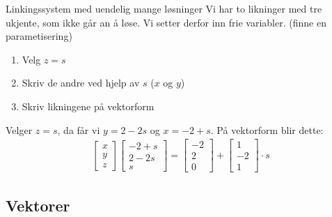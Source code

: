 \documentclass[11pt, a4paper, norsk]{article}
\begin{document}
\begin{Example}{Linkingssystem med uendelig mange løsninger}{}
           Vi har to likninger med tre ukjente, som ikke går an å løse. Vi setter derfor inn frie variabler. (finne en parametisering)
           \begin{enumerate}
               \item Velg $z = s$
               \item Skriv de andre ved hjelp av $s$ ($x$ og $y$)
               \item Skriv likningene på vektorform
           \end{enumerate}
           Velger $z=s$, da får vi $y = 2-2s$ og $x = -2+s$. På vektorform blir dette:
           \begin{align*}
               \begin{bmatrix}
                   x \\
                   y \\
                   z
                   \end{bmatrix} \begin{bmatrix}
                                    -2 + s \\
                                    2 - 2s \\
                                    s
                                    \end{bmatrix} = \begin{bmatrix}
                                                        -2 \\
                                                        2 \\
                                                        0
                                                        \end{bmatrix} + \begin{bmatrix}
                                                        1 \\
                                                        -2 \\
                                                        1
                                                    \end{bmatrix}\cdot s
           \end{align*}
        \end{Example}
        \subsection{Vektorer}%
        \label{sub:vektorer}
        
\end{document}
